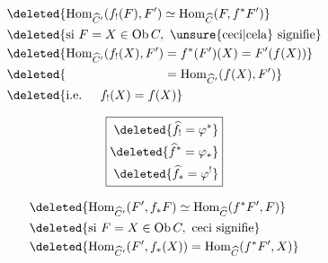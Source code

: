 

\[\begin{aligned}&\deleted{\operatorname{Hom}_{\widehat C'}(f_!(F),F')\simeq\operatorname{Hom}_{\widehat C}(F,f^*F')}\\&\deleted{\text{si }F=X\in\mathrm{Ob}\,C,\ \text{\unsure{ceci|cela} signifie}}\\&\deleted{\operatorname{Hom}_{\widehat C'}(f_!(X),F')=f^*(F')(X)=F'(f(X))}\\&\deleted{\hphantom{\operatorname{Hom}_{\widehat C'}(f_!(X),F')}=\operatorname{Hom}_{\widehat C'}(f(X),F')}\\&\deleted{\text{i.e. }\quad f_!(X)=f(X)}\end{aligned}\]


\[\boxed{\begin{aligned}\deleted{\widehat f_!=\varphi^*}\\ \deleted{\widehat f^*=\varphi_*}\\ \deleted{\widehat f_*=\varphi^!}\end{aligned}}\]

\[\begin{aligned}&\deleted{\operatorname{Hom}_{\widehat C'}(F',f_*F)\simeq\operatorname{Hom}_{\widehat C}(f^*F',F)}\\&\deleted{\text{si }F=X\in\mathrm{Ob}\,C,\ \text{ceci signifie}}\\&\deleted{\operatorname{Hom}_{\widehat C'}(F',f_*(X))=\operatorname{Hom}_{\widehat C}(f^*F',X)}\end{aligned}\]


